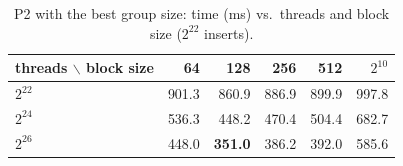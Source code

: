 \begin{table}[H]\centering\small
\caption{P2 with the best group size: time (ms) vs.\ threads and block size ($2^{22}$ inserts).}\label{tab:p2tune}
\begin{tabular}{lrrrrr}
\toprule
threads $\backslash$ block size & 64 & 128 & 256 & 512 & $2^{10}$ \\
\midrule
$2^{22}$ & 901.3 & 860.9 & 886.9 & 899.9 & 997.8 \\
$2^{24}$ & 536.3 & 448.2 & 470.4 & 504.4 & 682.7 \\
$2^{26}$ & 448.0 & \textbf{351.0} & 386.2 & 392.0 & 585.6 \\
\bottomrule
\end{tabular}
\end{table}

